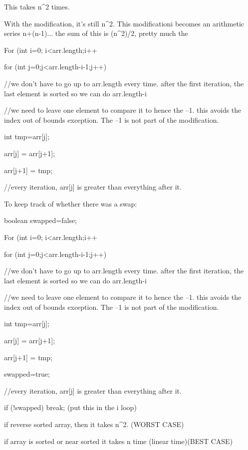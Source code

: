 {This takes n^2 times. 

With the modification, it's still n^2. This modificationi becomes an arithmetic series n+(n-1)... the sum of this is (n^2)/2, pretty much the  

For (int i=0; i<arr.length;i++{ 

for (int j=0;j<arr.length-i-1;j++){ 

//we don't have to go up to arr.length every time. after the first iteration, the last element is sorted so we can do arr.length-i 

//we need to leave one element to compare it to hence the –1. this avoids the index out of bounds exception. The –1 is not part of the modification. 

int tmp=arr[j]; 

arr[j] = arr[j+1]; 

arr[j+1] = tmp; 

//every iteration, arr[j] is greater than everything after it. 

} 

} 

 

To keep track of whether there was a swap: 

boolean swapped=false; 

For (int i=0; i<arr.length;i++{ 

for (int j=0;j<arr.length-i-1;j++){ 

//we don't have to go up to arr.length every time. after the first iteration, the last element is sorted so we can do arr.length-i 

//we need to leave one element to compare it to hence the –1. this avoids the index out of bounds exception. The –1 is not part of the modification. 

int tmp=arr[j]; 

arr[j] = arr[j+1]; 

arr[j+1] = tmp; 

swapped=true; 

//every iteration, arr[j] is greater than everything after it. 

} 

}if (!swapped) break; (put this in the i loop) 

} 

if reverse sorted array, then it takes n^2. (WORST CASE) 

if array is sorted or near sorted it takes n time (linear time)(BEST CASE) 

 

